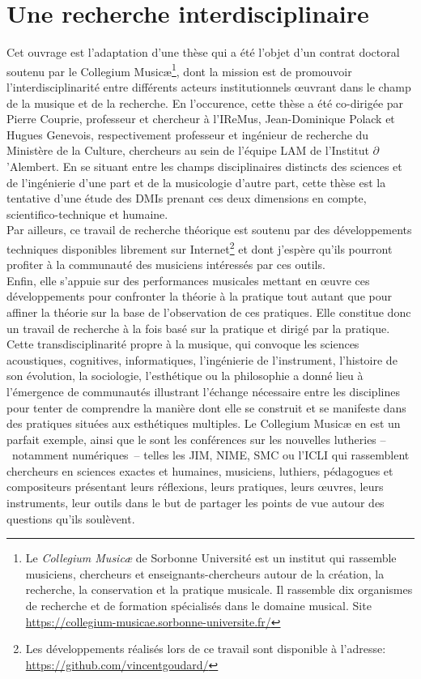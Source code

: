 \section{Une recherche interdisciplinaire}

\noindent Cet ouvrage est l'adaptation d'une thèse qui a été l'objet d'un contrat doctoral soutenu par le Collegium Musicæ\footnote{Le \textit{Collegium Musicæ} de Sorbonne Université est un institut qui rassemble musiciens, chercheurs et enseignants-chercheurs autour de la création, la recherche, la conservation et la pratique musicale. Il rassemble dix organismes de recherche et de formation spécialisés dans le domaine musical. Site \url{https://collegium-musicae.sorbonne-universite.fr/}}, dont la mission est de promouvoir l'interdisciplinarité entre différents acteurs institutionnels œuvrant dans le champ de la musique et de la recherche. En l'occurence, cette thèse a été co-dirigée par Pierre Couprie, professeur et chercheur à l'\gls{IReMus}, Jean-Dominique Polack et Hugues Genevois, respectivement professeur et ingénieur de recherche du Ministère de la Culture, chercheurs au sein de l'équipe \gls{LAM} de l'Institut $\partial$'Alembert. En se situant entre les champs disciplinaires distincts des sciences et de l'ingénierie d'une part et de la musicologie d'autre part, cette thèse est la tentative d'une étude des \glspl{DMI} prenant ces deux dimensions en compte, scientifico-technique et humaine.\\
\indent Par ailleurs, ce travail de recherche théorique est soutenu par des développements techniques disponibles librement sur Internet\footnote{Les développements réalisés lors de ce travail sont disponible à l'adresse: \url{https://github.com/vincentgoudard/}} et dont j'espère qu'ils pourront profiter à la communauté des musiciens intéressés par ces outils.\\
\indent Enfin, elle s'appuie sur des performances musicales mettant en œuvre ces développements pour confronter la théorie à la pratique tout autant que pour affiner la théorie sur la base de l'observation de ces pratiques. Elle constitue donc un travail de recherche à la fois basé sur la pratique et dirigé par la pratique.\\
\indent Cette transdisciplinarité propre à la musique, qui convoque les sciences acoustiques, cognitives, informatiques, l'ingénierie de l'instrument, l'histoire de son évolution, la sociologie, l'esthétique ou la philosophie a donné lieu à l'émergence de communautés illustrant l'échange nécessaire entre les disciplines pour tenter de comprendre la manière dont elle se construit et se manifeste dans des pratiques situées aux esthétiques multiples. Le Collegium Musicæ en est un parfait exemple, ainsi que le sont les conférences sur les nouvelles lutheries --~notamment numériques~-- telles les \gls{JIM}, \gls{NIME}, \gls{SMC} ou l'\gls{ICLI} qui rassemblent chercheurs en sciences exactes et humaines, musiciens, luthiers, pédagogues et compositeurs présentant leurs réflexions, leurs pratiques, leurs œuvres, leurs instruments, leur outils dans le but de partager les points de vue autour des questions qu'ils soulèvent.



